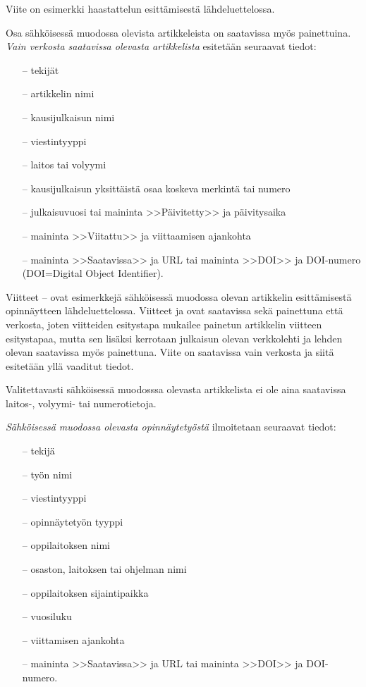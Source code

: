 \documentclass[english, 12pt, a4paper, elec, utf8, a-1b, online]{aaltothesis}
\begin{document}
Viite \cite{haastattelu} on esimerkki 
haastattelun esitt\"amisest\"a l\"ahdeluettelossa.

Osa s\"ahk\"oisess\"a muodossa olevista artikkeleista on saatavissa my\"os
painettuina. \textit{Vain verkosta saatavissa olevasta artikkelista} esitet\"a\"an
seuraavat tiedot:

\begin{itemize}
\item[--]tekij\"at
\item[--]artikkelin nimi
\item[--]kausijulkaisun nimi
\item[--]viestintyyppi
\item[--]laitos tai volyymi
\item[--]kausijulkaisun yksitt\"aist\"a osaa koskeva merkint\"a tai numero
\item[--]julkaisuvuosi tai maininta >>P\"aivitetty>> ja p\"aivitysaika
\item[--]maininta >>Viitattu>> ja viittaamisen ajankohta 
\item[--]maininta >>Saatavissa>> ja URL tai 
        maininta >>DOI>> ja DOI-numero (DOI=Digital Object Identifier).
\end{itemize}

Viitteet \cite{Ribeiro}--\cite{kone} ovat esimerkkej\"a s\"ahk\"oisess\"a
muodossa olevan artikkelin esitt\"amisest\"a opinn\"aytteen
l\"ahdeluettelossa.  Viitteet \cite{Ribeiro} ja \cite{Stieber} ovat
saatavissa sek\"a painettuna ett\"a verkosta, joten viitteiden esitystapa
mukailee painetun artikkelin viitteen esitystapaa, mutta sen lis\"aksi
kerrotaan julkaisun olevan verkkolehti ja lehden olevan saatavissa
my\"os painettuna.  Viite \cite{kone} on saatavissa vain verkosta ja
siit\"a esitet\"a\"an yll\"a vaaditut tiedot.

Valitettavasti s\"ahk\"oisess\"a muodosssa olevasta artikkelista ei ole aina 
saatavissa lai\-tos-, volyymi- tai numerotietoja.

\textit{S\"ahk\"oisess\"a muodossa olevasta opinn\"aytety\"ost\"a} ilmoitetaan
seuraavat tiedot:
 
\begin{itemize}
\item[--]tekij\"a
\item[--]ty\"on nimi
\item[--]viestintyyppi
\item[--]opinn\"aytety\"on tyyppi
\item[--]oppilaitoksen nimi
\item[--]osaston, laitoksen tai ohjelman nimi
\item[--]oppilaitoksen sijaintipaikka
\item[--]vuosiluku
\item[--]viittamisen ajankohta
\item[--]maininta >>Saatavissa>> ja URL tai 
        maininta >>DOI>> ja DOI-numero.
\end{itemize}
\end{document}
